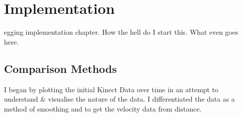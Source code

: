 %
%
\let\textcircled=\pgftextcircled
\chapter{Implementation}
\label{chap:intro}

egging implementation chapter. How the hell do I start this. What even goes here.

\section{Comparison Methods}
\label{sec:sec01}


I began by plotting the initial Kinect Data over time in an attempt to understand \& visualise the nature of the data. I differentiated the data as a method of smoothing and to get the velocity data from distance.


